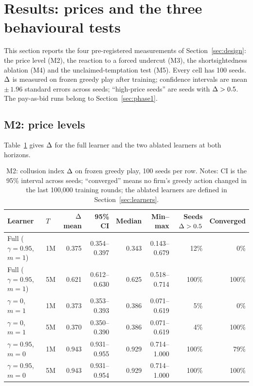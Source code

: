 
\section{Results: prices and the three behavioural tests}\label{sec:results}

This section reports the four pre-registered measurements of Section~\ref{sec:design}: the price level (M2), the reaction to a forced undercut (M3), the shortsightedness ablation (M4) and the unclaimed-temptation test (M5). Every cell has 100 seeds. $\Delta$ is measured on frozen greedy play after training; confidence intervals are mean $\pm\,1.96$ standard errors across seeds; ``high-price seeds'' are seeds with $\Delta > 0.5$. The pay-as-bid runs belong to Section~\ref{sec:phase1}.

\subsection{M2: price levels}

Table~\ref{tab:m2} gives $\Delta$ for the full learner and the two ablated learners at both horizons.

\begin{table}[htbp]
\centering
\caption{M2: collusion index $\Delta$ on frozen greedy play, 100 seeds per row. Notes: CI is the 95\% interval across seeds; ``converged'' means no firm's greedy action changed in the last 100,000 training rounds; the ablated learners are defined in Section~\ref{sec:learners}.}
\label{tab:m2}
\small
\setlength{\tabcolsep}{4pt}
\begin{tabular}{@{}llrrrrrr@{}}
\toprule
Learner & $T$ & $\Delta$ mean & 95\% CI & Median & Min--max & Seeds $\Delta>0.5$ & Converged \\
\midrule
Full ($\gamma=0.95$, $m=1$) & 1M & 0.375 & 0.354--0.397 & 0.343 & 0.143--0.679 & 12\% & 0\% \\
Full ($\gamma=0.95$, $m=1$) & 5M & 0.621 & 0.612--0.630 & 0.625 & 0.518--0.714 & 100\% & 100\% \\
$\gamma=0$, $m=1$ & 1M & 0.373 & 0.353--0.393 & 0.386 & 0.071--0.619 & 5\% & 0\% \\
$\gamma=0$, $m=1$ & 5M & 0.370 & 0.350--0.390 & 0.386 & 0.071--0.619 & 4\% & 100\% \\
$\gamma=0.95$, $m=0$ & 1M & 0.943 & 0.931--0.955 & 0.929 & 0.714--1.000 & 100\% & 79\% \\
$\gamma=0.95$, $m=0$ & 5M & 0.943 & 0.931--0.954 & 0.929 & 0.714--1.000 & 100\% & 100\% \\
\bottomrule
\end{tabular}
\end{table}

